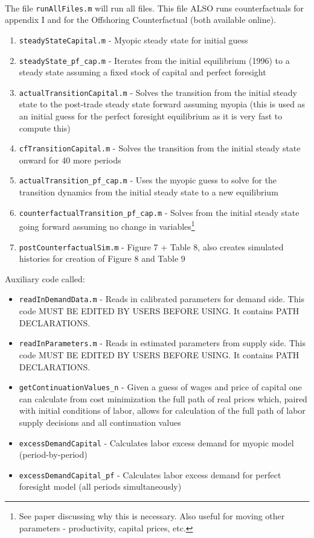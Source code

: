 \documentclass[11pt]{article}
\begin{document}
\\
The file \verb!runAllFiles.m! will run all files. This file ALSO runs counterfactuals for appendix I and for the Offshoring Counterfactual (both available online).
\begin{enumerate}
	\item \verb!steadyStateCapital.m! - Myopic steady state for initial guess
	\item \verb!steadyState_pf_cap.m! - Iterates from the initial equilibrium (1996) to a steady state assuming a fixed stock of capital and perfect foresight
	\item \verb!actualTransitionCapital.m! - Solves the transition from the initial steady state to the post-trade steady state forward assuming myopia (this is used as an initial guess for the perfect foresight equilibrium as it is very fast to compute this)
	\item \verb!cfTransitionCapital.m! - Solves the transition from the initial steady state onward for 40 more periods
	\item \verb!actualTransition_pf_cap.m! - Uses the myopic guess to solve for the transition dynamics from the initial steady state to a new equilibrium
	\item \verb!counterfactualTransition_pf_cap.m! - Solves from the initial steady state going forward assuming no change in variables\footnote{See paper discussing why this is necessary. Also useful for moving other parameters - productivity, capital prices, etc.}
	\item \verb!postCounterfactualSim.m! - Figure 7 + Table 8, also creates simulated histories for creation of Figure 8 and Table 9
\end{enumerate}
Auxiliary code called:
\begin{itemize}
	\item \verb!readInDemandData.m! - Reads in calibrated parameters for demand side. This code MUST BE EDITED BY USERS BEFORE USING. It contains PATH DECLARATIONS.
	\item \verb!readInParameters.m! - Reads in estimated parameters from supply side. This code MUST BE EDITED BY USERS BEFORE USING. It contains PATH DECLARATIONS.
	\item \verb!getContinuationValues_n! - Given a guess of wages and price of capital one can calculate from cost minimization the full path of real prices which, paired with initial conditions of labor, allows for calculation of the full path of labor supply decisions and all continuation values
	\item \verb!excessDemandCapital! - Calculates labor excess demand for myopic model (period-by-period)
	\item \verb!excessDemandCapital_pf! - Calculates labor excess demand for perfect foresight model (all periods simultaneously)
\end{itemize}
\end{document}

